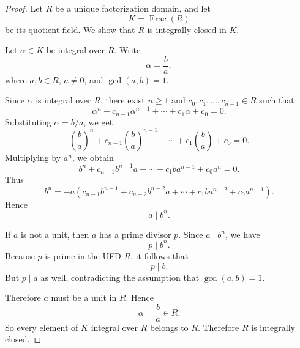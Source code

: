 \begin{proof}
    Let \(R\) be a unique factorization domain, and let
    \[
        K=\operatorname{Frac}(R)
    \]
    be its quotient field. We show that \(R\) is integrally closed in \(K\).

    Let \(\alpha\in K\) be integral over \(R\). Write
    \[
        \alpha=\frac{b}{a},
    \]
    where \(a,b\in R\), \(a\neq 0\), and \(\gcd(a,b)=1\).

    Since \(\alpha\) is integral over \(R\), there exist \(n\geq 1\) and
    \(c_0,c_1,\dots,c_{n-1}\in R\) such that
    \[
        \alpha^n+c_{n-1}\alpha^{n-1}+\cdots+c_1\alpha+c_0=0.
    \]
    Substituting \(\alpha=b/a\), we get
    \[
        \left(\frac{b}{a}\right)^n
        +c_{n-1}\left(\frac{b}{a}\right)^{n-1}
        +\cdots
        +c_1\left(\frac{b}{a}\right)
        +c_0
        =0.
    \]
    Multiplying by \(a^n\), we obtain
    \[
        b^n+c_{n-1}b^{n-1}a+\cdots+c_1ba^{n-1}+c_0a^n=0.
    \]
    Thus
    \[
        b^n
        =
        -a\left(c_{n-1}b^{n-1}
        +c_{n-2}b^{n-2}a
        +\cdots
        +c_1ba^{n-2}
        +c_0a^{n-1}\right).
    \]
    Hence
    \[
        a\mid b^n.
    \]

    If \(a\) is not a unit, then \(a\) has a prime divisor \(p\). Since \(a\mid b^n\),
    we have
    \[
        p\mid b^n.
    \]
    Because \(p\) is prime in the UFD \(R\), it follows that
    \[
        p\mid b.
    \]
    But \(p\mid a\) as well, contradicting the assumption that \(\gcd(a,b)=1\).

    Therefore \(a\) must be a unit in \(R\). Hence
    \[
        \alpha=\frac{b}{a}\in R.
    \]
    So every element of \(K\) integral over \(R\) belongs to \(R\). Therefore \(R\)
    is integrally closed.
\end{proof}

